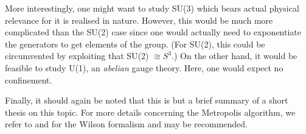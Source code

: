 \documentclass{scrartcl}
\begin{document}
More interestingly, one might want to study SU(3) which bears actual physical
relevance for it is realised in nature. However, this would be much more complicated 
than the SU(2) case since one would actually need to exponentiate the generators to
get elements of the group. (For SU(2), this could be circumvented by exploiting
that SU(2) $\cong S^3$.) On the other hand, it would be feasible to study
U(1), an  \emph{abelian} gauge theory. Here, one would expect no confinement.

Finally, it should again be noted that this is but a brief summary of a short
thesis on this topic. For more details concerning the Metropolis algorithm, we
refer to \cite{freedmanCreutz} and for the Wilson formalism
\cite{gattringerLang} and \cite{loopsStaticPotRothe} may be recommended.
\printbibliography
\end{document}
